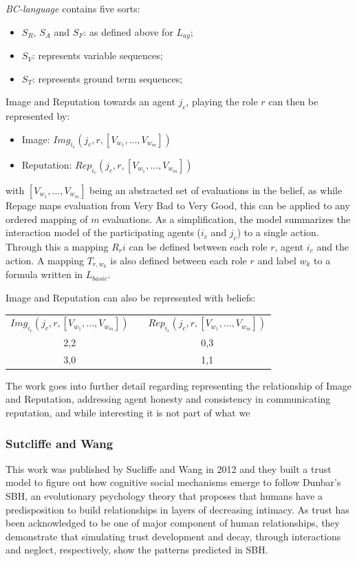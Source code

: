 \textit{\textit{BC}-language} contains five sorts:
\begin{itemize}
	\item $S_R$, $S_A$ and $S_F$: as defined above for $L_{ag}$;
	\item $S_V$: represents variable sequences;
	\item $S_T$: represents ground term sequences;
\end{itemize}

Image and Reputation towards an agent $j_c$, playing the role $r$ can then be represented by:
\begin{itemize}
	\item Image: $Img_{i_c} (j_c, r, [V_{w_1}, ..., V_{w_m}])$
	\item Reputation: $Rep_{i_c} (j_c, r, [V_{w_1}, ..., V_{w_m}])$
\end{itemize}
with $[V_{w_1}, ..., V_{w_m}]$ being an abstracted set of evaluations in the belief, as while Repage maps evaluation from Very Bad to Very Good, this can be applied to any ordered mapping of $m$ evaluations. As a simplification, the model summarizes the interaction model of the participating agents ($i_c$ and $j_c$) to a single action. Through this a mapping $R_ri$ can be defined between each role $r$, agent $i_c$ and the action. A mapping $T_{r, w_k}$ is also defined between each role $r$ and label $w_k$ to a formula written in $L_{basic}$.

Image and Reputation can also be represented with beliefs:

\begin{table}[]
	\centering
	\begin{tabular}{ccc}
		$Img_{i_c}(j_c, r, [V_{w_1}, ..., V_{w_m}])$  & & $Rep_{i_c} (j_c, r, [V_{w_1}, ..., V_{w_m}])$\\ \cline{1-1} \cline{3-3} 
		2,2 & & 0,3 \\
		3,0 & & 1,1
	\end{tabular}
\end{table}
The work goes into further detail regarding representing the relationship of Image and Reputation, addressing agent honesty and consistency in communicating reputation, and while interesting it is not part of what we 

\subsubsection{Sutcliffe and Wang}
\label{subsubsec:Related work:Sutcliffe and Wang}
This work was published by Sucliffe and Wang in 2012\cite{Sutcliffe2012} and they built a trust model to figure out how cognitive social mechanisms emerge to follow Dunbar's \ac{SBH}\cite{Dunbar1998}, an evolutionary psychology theory that proposes that humans have a predisposition to build relationships in layers of decreasing intimacy. As trust has been acknowledged to be one of major component of human relationships, they demonstrate that simulating trust development and decay, through interactions and neglect, respectively, show the patterns predicted in \ac{SBH}.

